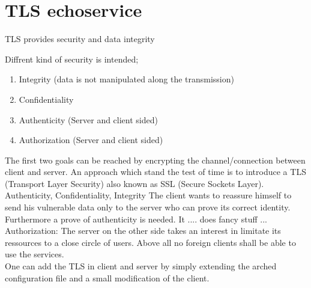 \chapter{TLS echoservice}

TLS provides security and data integrity


Diffrent kind of security is intended;
\begin{enumerate}
 \item Integrity (data is not manipulated along the transmission)
 \item Confidentiality 
 \item Authenticity (Server and client sided)
 \item Authorization (Server and client sided)
\end{enumerate}

The first two goals can be reached by encrypting the channel/connection between client and server. An approach 
which stand the test of time is to introduce a TLS (Transport Layer Security) also known as SSL (Secure Sockets Layer).
Authenticity, Confidentiality, Integrity
The client wants to reassure himself to send his vulnerable data only to the server who can prove its correct identity.
Furthermore a prove of authenticity is needed. %
It .... does fancy stuff ...
%
%
Authorization:  The server on the other side takes an interest in limitate its ressources to a close circle of users. Above all no foreign clients shall be able to use the services.\\

One can add the TLS in client and server by simply extending the arched configuration file and a small modification of the client.

\begin{figure}[htb]
	\centering%
	\\

\label{fig:HED_internal0}
\end{figure}


